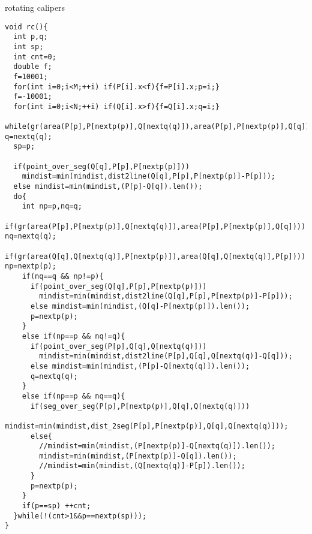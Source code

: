 \documentclass[a4paper]{article}
\begin{document}
rotating calipers
\begin{lstlisting}
void rc(){
  int p,q;
  int sp;
  int cnt=0;
  double f;
  f=10001;
  for(int i=0;i<M;++i) if(P[i].x<f){f=P[i].x;p=i;}
  f=-10001;
  for(int i=0;i<N;++i) if(Q[i].x>f){f=Q[i].x;q=i;}
  while(gr(area(P[p],P[nextp(p)],Q[nextq(q)]),area(P[p],P[nextp(p)],Q[q]))) q=nextq(q);
  sp=p;

  if(point_over_seg(Q[q],P[p],P[nextp(p)]))
    mindist=min(mindist,dist2line(Q[q],P[p],P[nextp(p)]-P[p]));
  else mindist=min(mindist,(P[p]-Q[q]).len());
  do{
    int np=p,nq=q;
    if(gr(area(P[p],P[nextp(p)],Q[nextq(q)]),area(P[p],P[nextp(p)],Q[q]))) nq=nextq(q);
    if(gr(area(Q[q],Q[nextq(q)],P[nextp(p)]),area(Q[q],Q[nextq(q)],P[p]))) np=nextp(p);
    if(nq==q && np!=p){
      if(point_over_seg(Q[q],P[p],P[nextp(p)]))
        mindist=min(mindist,dist2line(Q[q],P[p],P[nextp(p)]-P[p]));
      else mindist=min(mindist,(Q[q]-P[nextp(p)]).len());
      p=nextp(p);
    }
    else if(np==p && nq!=q){
      if(point_over_seg(P[p],Q[q],Q[nextq(q)]))
        mindist=min(mindist,dist2line(P[p],Q[q],Q[nextq(q)]-Q[q]));
      else mindist=min(mindist,(P[p]-Q[nextq(q)]).len());
      q=nextq(q);
    }
    else if(np==p && nq==q){
      if(seg_over_seg(P[p],P[nextp(p)],Q[q],Q[nextq(q)]))
        mindist=min(mindist,dist_2seg(P[p],P[nextp(p)],Q[q],Q[nextq(q)]));
      else{
        //mindist=min(mindist,(P[nextp(p)]-Q[nextq(q)]).len());
        mindist=min(mindist,(P[nextp(p)]-Q[q]).len());
        //mindist=min(mindist,(Q[nextq(q)]-P[p]).len());
      }
      p=nextp(p);
    }
    if(p==sp) ++cnt;
  }while(!(cnt>1&&p==nextp(sp)));
}
\end{lstlisting}
\end{document}
